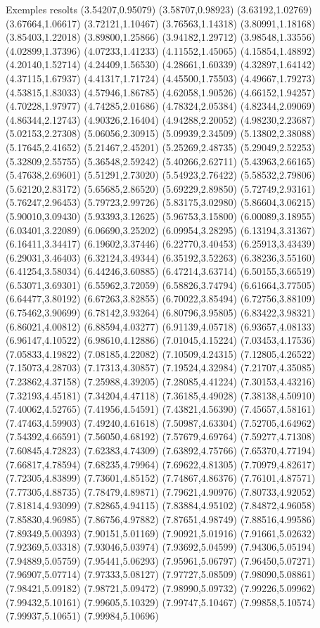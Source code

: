 \documentclass[11pt,a4paper]{article}
\begin{document}
\begin{fmex}{Exemples resolts}
(3.54207,0.95079) (3.58707,0.98923) (3.63192,1.02769) (3.67664,1.06617) (3.72121,1.10467) (3.76563,1.14318) (3.80991,1.18168) (3.85403,1.22018) (3.89800,1.25866) (3.94182,1.29712) (3.98548,1.33556) (4.02899,1.37396) (4.07233,1.41233) (4.11552,1.45065) (4.15854,1.48892) (4.20140,1.52714) (4.24409,1.56530) (4.28661,1.60339) (4.32897,1.64142) (4.37115,1.67937) (4.41317,1.71724) (4.45500,1.75503) (4.49667,1.79273) (4.53815,1.83033) (4.57946,1.86785) (4.62058,1.90526) (4.66152,1.94257) (4.70228,1.97977) (4.74285,2.01686) (4.78324,2.05384) (4.82344,2.09069) (4.86344,2.12743) (4.90326,2.16404) (4.94288,2.20052) (4.98230,2.23687) (5.02153,2.27308) (5.06056,2.30915) (5.09939,2.34509) (5.13802,2.38088) (5.17645,2.41652) (5.21467,2.45201) (5.25269,2.48735) (5.29049,2.52253) (5.32809,2.55755) (5.36548,2.59242) (5.40266,2.62711) (5.43963,2.66165) (5.47638,2.69601) (5.51291,2.73020) (5.54923,2.76422) (5.58532,2.79806) (5.62120,2.83172) (5.65685,2.86520) (5.69229,2.89850) (5.72749,2.93161) (5.76247,2.96453) (5.79723,2.99726) (5.83175,3.02980) (5.86604,3.06215) (5.90010,3.09430) (5.93393,3.12625) (5.96753,3.15800) (6.00089,3.18955) (6.03401,3.22089) (6.06690,3.25202) (6.09954,3.28295) (6.13194,3.31367) (6.16411,3.34417) (6.19602,3.37446) (6.22770,3.40453) (6.25913,3.43439) (6.29031,3.46403) (6.32124,3.49344) (6.35192,3.52263) (6.38236,3.55160) (6.41254,3.58034) (6.44246,3.60885) (6.47214,3.63714) (6.50155,3.66519) (6.53071,3.69301) (6.55962,3.72059) (6.58826,3.74794) (6.61664,3.77505) (6.64477,3.80192) (6.67263,3.82855) (6.70022,3.85494) (6.72756,3.88109) (6.75462,3.90699) (6.78142,3.93264) (6.80796,3.95805) (6.83422,3.98321) (6.86021,4.00812) (6.88594,4.03277) (6.91139,4.05718) (6.93657,4.08133) (6.96147,4.10522) (6.98610,4.12886) (7.01045,4.15224) (7.03453,4.17536) (7.05833,4.19822) (7.08185,4.22082) (7.10509,4.24315) (7.12805,4.26522) (7.15073,4.28703) (7.17313,4.30857) (7.19524,4.32984) (7.21707,4.35085) (7.23862,4.37158) (7.25988,4.39205) (7.28085,4.41224) (7.30153,4.43216) (7.32193,4.45181) (7.34204,4.47118) (7.36185,4.49028) (7.38138,4.50910) (7.40062,4.52765) (7.41956,4.54591) (7.43821,4.56390) (7.45657,4.58161) (7.47463,4.59903) (7.49240,4.61618) (7.50987,4.63304) (7.52705,4.64962) (7.54392,4.66591) (7.56050,4.68192) (7.57679,4.69764) (7.59277,4.71308) (7.60845,4.72823) (7.62383,4.74309) (7.63892,4.75766) (7.65370,4.77194) (7.66817,4.78594) (7.68235,4.79964) (7.69622,4.81305) (7.70979,4.82617) (7.72305,4.83899) (7.73601,4.85152) (7.74867,4.86376) (7.76101,4.87571) (7.77305,4.88735) (7.78479,4.89871) (7.79621,4.90976) (7.80733,4.92052) (7.81814,4.93099) (7.82865,4.94115) (7.83884,4.95102) (7.84872,4.96058) (7.85830,4.96985) (7.86756,4.97882) (7.87651,4.98749) (7.88516,4.99586) (7.89349,5.00393) (7.90151,5.01169) (7.90921,5.01916) (7.91661,5.02632) (7.92369,5.03318) (7.93046,5.03974) (7.93692,5.04599) (7.94306,5.05194) (7.94889,5.05759) (7.95441,5.06293) (7.95961,5.06797) (7.96450,5.07271) (7.96907,5.07714) (7.97333,5.08127) (7.97727,5.08509) (7.98090,5.08861) (7.98421,5.09182) (7.98721,5.09472) (7.98990,5.09732) (7.99226,5.09962) (7.99432,5.10161) (7.99605,5.10329) (7.99747,5.10467) (7.99858,5.10574) (7.99937,5.10651) (7.99984,5.10696) 
\end{fmex}
\end{document}
